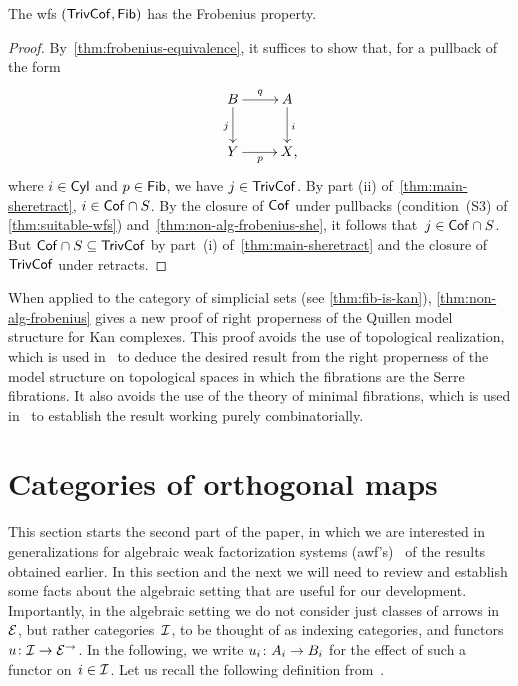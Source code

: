 \documentclass[reqno,10pt,a4paper,oneside,draft]{amsart}
\begin{document}
{{\begin{theorem} \label{thm:non-alg-frobenius}
The wfs $(\TrivCof, \Fib)$ has the Frobenius property.
\end{theorem}

\begin{proof}
By~\cref{thm:frobenius-equivalence}, it suffices to show that, for a pullback of the form
\begin{equation*}
\begin{gathered}
\xymatrix{
 B \ar[d]_j \ar[r]^q & A \ar[d]^i \\
Y \ar[r]_p & X \rlap{,}}
\end{gathered}
\end{equation*}
where $i \in \Cyl$ and $p \in \Fib$, we have $j \in \TrivCof$.
By part (ii) of~\cref{thm:main-sheretract}, $i \in \Cof \cap S$.
By the closure of $\Cof$ under pullbacks (condition~(S3) of \cref{thm:suitable-wfs}) and~\cref{thm:non-alg-frobenius-she}, it follows that~$j \in \Cof \cap S$.
But $\Cof \cap S \subseteq \TrivCof$ by part~(i) of~\cref{thm:main-sheretract} and the closure of $\TrivCof$ under retracts.
\end{proof}

\begin{example}
When applied to the category of simplicial sets (see \cref{thm:fib-is-kan}), \cref{thm:non-alg-frobenius} gives a new proof of right properness of the Quillen model structure for Kan complexes.
This proof avoids the use of topological realization, which is used in~\cite[Theorem~13.1.13]{hirschhorn-model-localizations} to deduce the desired result from the right properness of the model structure on topological spaces in which the fibrations are the Serre fibrations.
It also avoids the use of the theory of minimal fibrations, which is used in~\cite[Theorem~1.7.1]{joyal-tierney-notes} to establish the result working purely combinatorially.
\end{example}

\section{Categories of orthogonal maps}
\label{sec:ortf}

This section starts the second part of the paper, in which we are interested in generalizations for 
algebraic weak factorization systems (awf's)~\cite{garner:small-object-argument,grandis-tholen-nwfs}
of the results obtained earlier.
In this section and the next we will need to review and establish some facts about the algebraic setting that are useful for our development.
Importantly, in the algebraic setting we do not consider just classes of arrows in $\catE$, but rather categories~$\cal{I}$, to be thought of as indexing categories, and functors~$u \co \cal{I} \to \catE^\to$.
In the following, we write $u_i \co A_i \to B_i$ for the effect of such a functor on~$i \in \cal{I}$.
Let us recall the following definition from~\cite{garner:small-object-argument}.

}}
\end{document}
